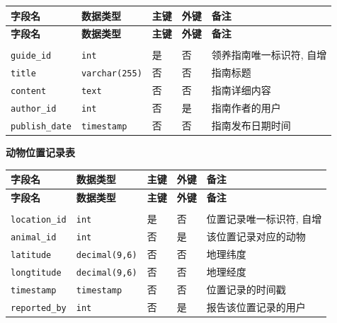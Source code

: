 \documentclass[12pt,a4paper,UTF8]{article}
\begin{document}
\begin{xltabular}{\linewidth}{|>{\raggedright\arraybackslash}p{3cm}|>{\raggedright\arraybackslash}p{3cm}|>{\raggedright\arraybackslash}p{1cm}|>{\raggedright\arraybackslash}p{1cm}|>{\raggedright\arraybackslash}p{5cm}|}
\hline
\textbf{字段名} & \textbf{数据类型} & \textbf{主键} & \textbf{外键} & \textbf{备注} \\ \hline
\endfirsthead

\hline
\textbf{字段名} & \textbf{数据类型} & \textbf{主键} & \textbf{外键} & \textbf{备注} \\ \hline
\endhead

\hline
{} \\
\endfoot

\hline 
\endlastfoot

\verb|guide_id| & \verb|int| & 是 & 否 & 领养指南唯一标识符, 自增 \\ \hline
\verb|title| & \verb|varchar(255)| & 否 & 否 & 指南标题 \\ \hline
\verb|content| & \verb|text| & 否 & 否 & 指南详细内容 \\ \hline
\verb|author_id| & \verb|int| & 否 & 是 & 指南作者的用户\\ \hline
\verb|publish_date| & \verb|timestamp| & 否 & 否 & 指南发布日期时间 \\ \hline
\end{xltabular}

\vspace{0.25cm}

\noindent\textbf{动物位置记录表}

\begin{xltabular}{\linewidth}{|>{\raggedright\arraybackslash}p{3cm}|>{\raggedright\arraybackslash}p{3cm}|>{\raggedright\arraybackslash}p{1cm}|>{\raggedright\arraybackslash}p{1cm}|>{\raggedright\arraybackslash}p{5cm}|}
\hline
\textbf{字段名} & \textbf{数据类型} & \textbf{主键} & \textbf{外键} & \textbf{备注} \\ \hline
\endfirsthead

\hline
\textbf{字段名} & \textbf{数据类型} & \textbf{主键} & \textbf{外键} & \textbf{备注} \\ \hline
\endhead

\hline
{} \\
\endfoot

\hline 
\endlastfoot

\verb|location_id| & \verb|int| & 是 & 否 & 位置记录唯一标识符, 自增 \\ \hline
\verb|animal_id| & \verb|int| & 否 & 是 & 该位置记录对应的动物\\ \hline
\verb|latitude| & \verb|decimal(9,6)| & 否 & 否 & 地理纬度 \\ \hline
\verb|longtitude| & \verb|decimal(9,6)| & 否 & 否 & 地理经度 \\ \hline
\verb|timestamp| & \verb|timestamp| & 否 & 否 & 位置记录的时间戳 \\ \hline
\verb|reported_by| & \verb|int| & 否 & 是 & 报告该位置记录的用户\\ \hline
\end{xltabular}
\end{document}
